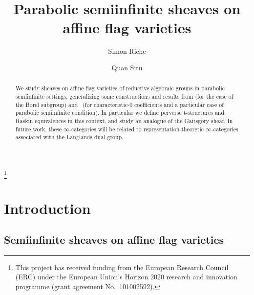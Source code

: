 \documentclass[11pt]{amsart}
\numberwithin{equation}{section}
\theoremstyle{plain}
\theoremstyle{definition}
\begin{document}
\title{Parabolic semiinfinite sheaves on affine flag varieties}

\makeatletter
\let\MakeUppercase\relax%
\makeatother

\author{Simon Riche}
\address{Universit\'e Clermont Auvergne, CNRS, LMBP, F-63000 Clermont-Ferrand, France, Institut Universitaire de France.}

\author{Quan Situ}
\address{Institute of Science and Technology Austria (ISTA), Am Campus 1, 3400 Klosterneuburg, Austria.}

\thanks{
This project has received
funding from the European Research Council (ERC) under the European Union's Horizon 2020
research and innovation programme (grant agreement No.~101002592).
}

\date{}

\begin{abstract}
We study sheaves on affine flag varieties of reductive algebraic groups in parabolic semiinfinite settings, generalizing some constructions and results from \cite{Gaits18,adr} (for the case of the Borel subgroup) and~\cite{DL23} (for characteristic-$0$ coefficients and a particular case of parabolic semiinfinite condition). In particular we define perverse t-structures and Raskin equivalences in this context, and study an analogue of the Gaitsgory sheaf. In future work, these $\infty$-categories will be related to representation-theoretic $\infty$-categories associated with the Langlands dual group.
\end{abstract}

\maketitle

{\small{\setcounter{tocdepth}{1} \tableofcontents}}

\section{Introduction} 

\subsection{Semiinfinite sheaves on affine flag varieties}
\end{document}
